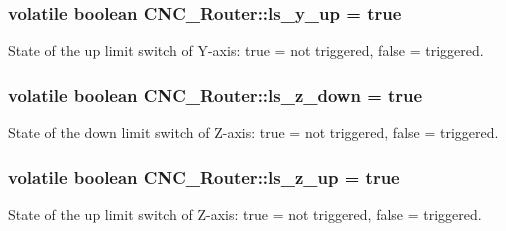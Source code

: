 \hypertarget{class_c_n_c___router_a74a44cdb470bb6256551bffc3538b938}{
\subsubsection[{ls\+\_\+y\+\_\+up}]{\setlength{\rightskip}{0pt plus 5cm}volatile boolean C\+N\+C\+\_\+\+Router\+::ls\+\_\+y\+\_\+up = true\hspace{0.3cm}{\ttfamily [static]}}}\label{class_c_n_c___router_a74a44cdb470bb6256551bffc3538b938}


State of the up limit switch of Y-\/axis\+: true = not triggered, false = triggered. 

\hypertarget{class_c_n_c___router_a30b5c6e169b20b9d8b11be6d638b2958}{
\subsubsection[{ls\+\_\+z\+\_\+down}]{\setlength{\rightskip}{0pt plus 5cm}volatile boolean C\+N\+C\+\_\+\+Router\+::ls\+\_\+z\+\_\+down = true\hspace{0.3cm}{\ttfamily [static]}}}\label{class_c_n_c___router_a30b5c6e169b20b9d8b11be6d638b2958}


State of the down limit switch of Z-\/axis\+: true = not triggered, false = triggered. 

\hypertarget{class_c_n_c___router_a1f573ec5b6c857e5aee5cebb7ad9c158}{
\subsubsection[{ls\+\_\+z\+\_\+up}]{\setlength{\rightskip}{0pt plus 5cm}volatile boolean C\+N\+C\+\_\+\+Router\+::ls\+\_\+z\+\_\+up = true\hspace{0.3cm}{\ttfamily [static]}}}\label{class_c_n_c___router_a1f573ec5b6c857e5aee5cebb7ad9c158}


State of the up limit switch of Z-\/axis\+: true = not triggered, false = triggered. 

